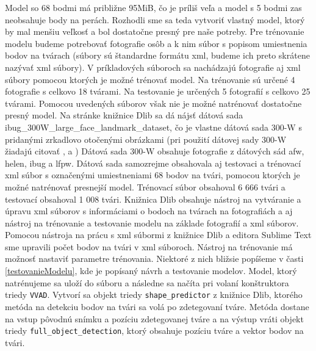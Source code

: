 Model so 68 bodmi má približne 95MiB, čo je príliš veľa a model s 5 bodmi zas neobsahuje body na perách.
Rozhodli sme sa teda vytvoriť vlastný model, ktorý by mal menšiu veľkosť a bol dostatočne presný pre naše potreby.
Pre trénovanie modelu budeme potrebovať fotografie osôb a k nim súbor s popisom umiestnenia bodov na tvárach (súbory sú štandardne formátu xml, budeme ich preto skrátene nazývať xml súbory).
V príkladových súboroch sa nachádzajú fotografie aj xml súbory pomocou ktorých je možné trénovať model.
Na trénovanie sú určené 4 fotografie s celkovo 18 tvárami.
Na testovanie je určených 5 fotografií s celkovo 25 tvárami.
Pomocou uvedených súborov však nie je možné natrénovať dostatočne presný model.
Na stránke knižnice Dlib sa dá nájsť dátová sada ibug\_300W\_large\_face\_landmark\_dataset, čo je vlastne dátová sada 300-W \cite{ibug} s pridanými zrkadlovo otočenými obrázkami (pri použití dátovej sady  300-W \cite{ibug} žiadajú citovať \cite{sagonas2016300}, \cite{sagonas2013300} a \cite{sagonas2013semi}) 
Dátová sada  300-W \cite{ibug} obsahuje fotografie z dátových sád afw, helen, ibug a lfpw. 
Dátová sada samozrejme obsahovala aj testovaci a trénovací xml súbor s označenými umiestneniami 68 bodov na tvári, pomocou ktorých je možné natrénovať presnejší model.
Trénovací súbor obsahoval 6 666 tvári a testovací obsahoval 1 008 tvári.
Knižnica Dlib obsahuje nástroj na vytváranie a úpravu xml súborov s informáciami o bodoch na tvárach na fotografiách a aj nástroj na trénovanie a testovanie modelu na základe fotografií a xml súborov.
Pomocou nástroja na prácu s xml súbormi z knižnice Dlib a editora Sublime Text sme upravili počet bodov na tvári v xml súboroch.
Nástroj na trénovanie má možnosť nastaviť parametre trénovania.
Niektoré z nich bližsie popíšeme v časti \ref{testovanieModelu}, kde je popísaný návrh a testovanie modelov.
Model, ktorý natrénujeme sa uloží do súboru a následne sa načíta pri volaní konštruktora triedy \texttt{VVAD}.
Vytvorí sa objekt triedy \texttt{shape\_predictor} z knižnice Dlib, ktorého metóda na detekciu bodov na tvári sa volá po zdetegovaní tváre.
Metóda dostane na vstup pôvodnú snímku a pozíciu zdetegovanej tváre a na výstup vráti objekt triedy \texttt{full\_object\_detection}, ktorý obsahuje pozíciu tváre a vektor bodov na tvári.

